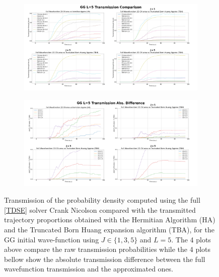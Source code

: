 \documentclass[11pt, a4paper]{article} %
\begin{document}
\begin{figure}[p]
  \centering
  \begin{subfigure}[b]{1.1\linewidth}
    \includegraphics[width=\linewidth]{Example_Results/GG_L_5_transmission.png}
  \end{subfigure}
  \begin{subfigure}[b]{1.1\linewidth}
    \includegraphics[width=\linewidth]{Example_Results/GG_L_5_errors.png}
  \end{subfigure}

  
  \caption{ Transmission of the probability density computed using the full \ref{TDSE} solver Crank Nicolson compared with the transmitted trajectory proportions obtained with the Hermitian Algorithm (HA) and the Truncated Born Huang expansion algorithm (TBA), for the GG initial wave-function using $J\in\{1,3,5\}$ and $L=5$. The 4 plots above compare the raw transmission probabilities while the 4 plots bellow show the absolute transmission difference between the full wavefunction transmission and the approximated ones.}
  \label{fig:transm_GG_L5}
\end{figure}
\end{document}
